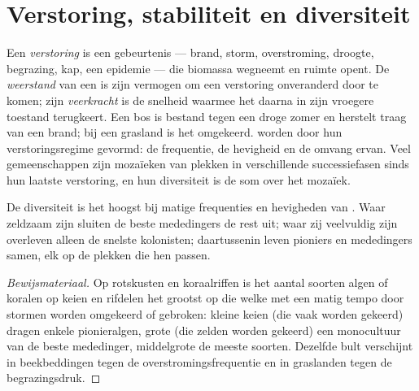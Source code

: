 \section{Verstoring, stabiliteit en diversiteit}

\begin{definition}\label{def:b1:ecosystem-dynamics:disturbance}
Een \emph{verstoring} is een gebeurtenis --- brand, storm, overstroming,
droogte, begrazing, kap, een epidemie --- die biomassa wegneemt en ruimte
opent. De \emph{weerstand} van een  is zijn vermogen om een
verstoring onveranderd door te komen; zijn \emph{veerkracht} is de snelheid
waarmee het daarna in zijn vroegere toestand terugkeert. Een bos is
bestand tegen een droge zomer en herstelt traag van een brand; bij een
grasland is het omgekeerd.  worden door hun
verstoringsregime gevormd: de frequentie, de hevigheid en de omvang ervan.
Veel gemeenschappen zijn mozaïeken van plekken in verschillende
successiefasen sinds hun laatste verstoring, en hun diversiteit is de som
over het mozaïek.
\end{definition}

\begin{proposition}\label{prop:b1:ecosystem-dynamics:idh}
De diversiteit is het hoogst bij matige frequenties en hevigheden van
. Waar  zeldzaam zijn sluiten de beste mededingers de
rest uit; waar zij veelvuldig zijn overleven alleen de snelste kolonisten;
daartussenin leven pioniers en mededingers samen, elk op de plekken die hen
passen.
\end{proposition}
\begin{proof}[Bewijsmateriaal]
Op rotskusten en koraalriffen is het aantal soorten algen of koralen op
keien en rifdelen het grootst op die welke met een matig tempo door stormen
worden omgekeerd of gebroken: kleine keien (die vaak worden gekeerd) dragen
enkele pionieralgen, grote (die zelden worden gekeerd) een monocultuur van
de beste mededinger, middelgrote de meeste soorten. Dezelfde bult verschijnt
in beekbeddingen tegen de overstromingsfrequentie en in graslanden tegen de
begrazingsdruk.
\end{proof}

